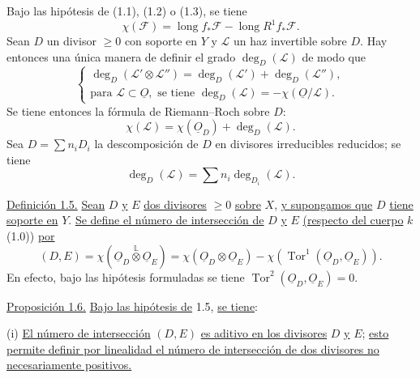 Bajo las hipótesis de (1.1), (1.2) o (1.3), se tiene
\begin{equation}\tag{1.4.4}
\chi(\mathcal F)=\operatorname{long} f_*\mathcal F-
\operatorname{long} R^1f_*\mathcal F.
\end{equation}
Sean $D$ un divisor $\geq0$ con soporte en $Y$ y $\mathcal L$ un haz
invertible sobre $D$. Hay entonces una única manera de definir el grado
$\deg_D(\mathcal L)$ de modo que
\begin{equation}\tag{1.4.5}
\left\{
\begin{array}{l}
\deg_D(\mathcal L'\otimes\mathcal L'')=
\deg_D(\mathcal L')+\deg_D(\mathcal L''),\\[3ex]
\text{para }\mathcal L\subset\underline O,
\text{ se tiene }\deg_D(\mathcal L)=-\chi(\underline O/\mathcal L).
\end{array}
\right.
\end{equation}
Se tiene entonces la fórmula de Riemann--Roch sobre $D$:
\begin{equation}\tag{1.4.6}
\chi(\mathcal L)=\chi(\underline{O}_D)+\deg_D(\mathcal L).
\end{equation}
Sea $D=\sum n_iD_i$ la descomposición de $D$ en divisores irreducibles
reducidos; se tiene
\begin{equation}\tag{1.4.7}
\deg_D(\mathcal L)=\sum n_i\deg_{D_i}(\mathcal L).
\end{equation}

\medskip
\noindent\underline{Definición 1.5.}
\underline{Sean} $D$ \underline{y} $E$ \underline{dos divisores} $\geq0$
\underline{sobre} $X$, \underline{y supongamos que} $D$ \underline{tiene
soporte en} $Y$. \underline{Se define el número de intersección de} $D$
\underline{y} $E$ \underline{(respecto del cuerpo} $k$ (1.0)) \underline{por}
\begin{equation*}
(D,E)=\chi(\underline{O}_D\overset{\mathbb L}{\otimes}\underline{O}_E)
=\chi(\underline{O}_D\otimes\underline{O}_E)
-\chi(\operatorname{Tor}^1(\underline{O}_D,\underline{O}_E)).
\end{equation*}
En efecto, bajo las hipótesis formuladas se tiene
$\operatorname{Tor}^2(\underline{O}_D,\underline{O}_E)=0$.

\medskip
\noindent\underline{Proposición 1.6.}
\underline{Bajo las hipótesis de} 1.5, \underline{se tiene}:

\medskip
\noindent (i) \quad \underline{El número de intersección} $(D,E)$
\underline{es aditivo en los divisores} $D$ \underline{y} $E$;
\underline{esto permite definir por linealidad el número de intersección de dos
divisores no necesariamente positivos.}

